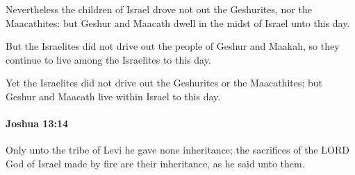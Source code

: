 			\begin{versebox}
					\item[BHS] 
					\item[ASV] Nevertheless the children of Israel drove not out the Geshurites, nor the Maacathites: but Geshur and Maacath dwell in the midst of Israel unto this day.
					\item[NIV] But the Israelites did not drive out the people of Geshur and Maakah, so they continue to live among the Israelites to this day.
					\item[NRSV] Yet the Israelites did not drive out the Geshurites or the Maacathites; but Geshur and Maacath live within Israel to this day.
			\end{versebox}

		\paragraph{Joshua 13:14} %
			\label{JOSHUA-13-14}

			Only unto the tribe of Levi he gave none inheritance; the sacrifices of the LORD God of Israel made by fire are their inheritance, as he said unto them.


